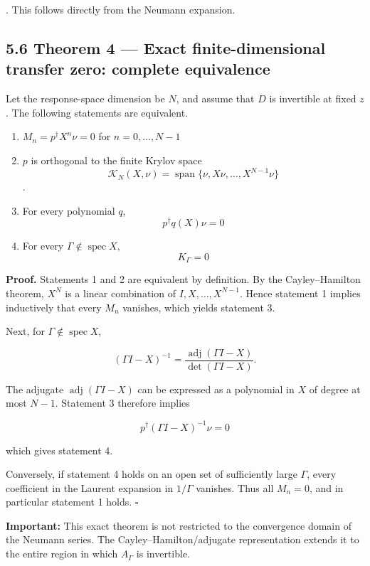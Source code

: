 \documentclass[
  10pt,
  a4paper,
]{article}
\providecommand{\tightlist}{%
  \setlength{\itemsep}{0pt}\setlength{\parskip}{0pt}}
\begin{document}
. This follows directly from the Neumann expansion.

\subsection{5.6 Theorem 4 --- Exact finite-dimensional transfer zero:
complete
equivalence}\label{theorem-4-exact-finite-dimensional-transfer-zero-complete-equivalence}

Let the response-space dimension be \(N\), and assume that \(D\) is
invertible at fixed \(z\). The following statements are equivalent.

\begin{enumerate}
\def\labelenumi{\arabic{enumi}.}
\tightlist
\item
  \(M_n=p^\dagger X^n\nu=0\) for \(n=0,\ldots,N-1\)
\item
  \(p\) is orthogonal to the finite Krylov space \[
  \mathcal K_N(X,\nu)
  =\operatorname{span}\{\nu,X\nu,\ldots,X^{N-1}\nu\}
  \] .
\item
  For every polynomial \(q\), \[
  p^\dagger q(X)\nu=0
  \]
\item
  For every \(\Gamma\notin\operatorname{spec}X\), \[
  \boxed{K_\Gamma=0}
  \]
\end{enumerate}

\textbf{Proof.} Statements 1 and 2 are equivalent by definition. By the
Cayley--Hamilton theorem, \(X^N\) is a linear combination of
\(I,X,\ldots,X^{N-1}\). Hence statement 1 implies inductively that every
\(M_n\) vanishes, which yields statement 3.

Next, for \(\Gamma\notin\operatorname{spec}X\),

\[
(\Gamma I-X)^{-1}
=\frac{\operatorname{adj}(\Gamma I-X)}
{\det(\Gamma I-X)}.
\]

The adjugate \(\operatorname{adj}(\Gamma I-X)\) can be expressed as a
polynomial in \(X\) of degree at most \(N-1\). Statement 3 therefore
implies

\[
p^\dagger(\Gamma I-X)^{-1}\nu=0
\]

which gives statement 4.

Conversely, if statement 4 holds on an open set of sufficiently large
\(\Gamma\), every coefficient in the Laurent expansion in \(1/\Gamma\)
vanishes. Thus all \(M_n=0\), and in particular statement 1 holds.
\(\square\)

\textbf{Important:} This exact theorem is not restricted to the
convergence domain of the Neumann series. The Cayley--Hamilton/adjugate
representation extends it to the entire region in which \(A_\Gamma\) is
invertible.
\end{document}
